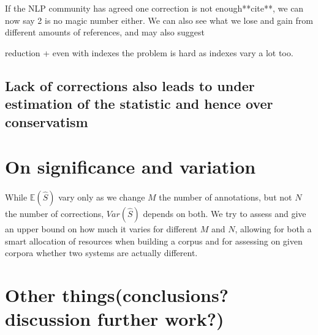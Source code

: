 \documentclass[english]{article}
\begin{document}
If the NLP community has agreed one correction is not enough{*}{*}cite{*}{*},
we can now say 2 is no magic number either. We can also see what we
lose and gain from different amounts of references, and may also suggest 

reduction + even with indexes the problem is hard as indexes vary
a lot too.

\subsection{Lack of corrections also leads to under estimation of the statistic
and hence over conservatism}

\section{On significance and variation}

While $\mathbb{E}\left(\hat{S}\right)$ vary only as we change $M$
the number of annotations, but not $N$ the number of corrections,
$Var(\hat{S})$ depends on both. We try to assess and give an upper
bound on how much it varies for different $M$ and $N$, allowing
for both a smart allocation of resources when building a corpus and
for assessing on given corpora whether two systems are actually different.

\section{Other things(conclusions? discussion further work?)}



\end{document}
